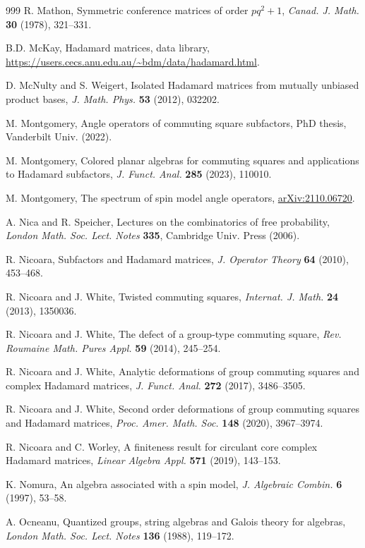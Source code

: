 \documentclass[11pt]{amsart}
\newcommand{\arx}[1]{{\hypersetup{allcolors=black}\href{https://arxiv.org/pdf/#1}{arXiv:#1}}}
\begin{document}
\begin{thebibliography}{999}
 R. Mathon, Symmetric conference matrices of order $pq^2+1$, {\em Canad. J. Math.} {\bf 30} (1978), 321--331.

 B.D. McKay, Hadamard matrices, data library, \url{https://users.cecs.anu.edu.au/~bdm/data/hadamard.html}.

 D. McNulty and S. Weigert, Isolated Hadamard matrices from mutually unbiased product bases, {\em J. Math. Phys.} {\bf 53} (2012), 032202.

 M. Montgomery, Angle operators of commuting square subfactors, PhD thesis, Vanderbilt Univ. (2022).

 M. Montgomery, Colored planar algebras for commuting squares and applications to Hadamard subfactors, {\em J. Funct. Anal.} {\bf 285} (2023), 110010.

 M. Montgomery, The spectrum of spin model angle operators, \arx{2110.06720}.

 A. Nica and R. Speicher, Lectures on the combinatorics of free probability, {\em London Math. Soc. Lect. Notes} {\bf 335}, Cambridge Univ. Press (2006).

 R. Nicoara, Subfactors and Hadamard matrices, {\em J. Operator Theory} {\bf 64} (2010), 453--468.

 R. Nicoara and J. White, Twisted commuting squares, {\em Internat. J. Math.} {\bf 24} (2013), 1350036.

 R. Nicoara and J. White, The defect of a group-type commuting square, {\em Rev. Roumaine Math. Pures Appl.} {\bf 59} (2014), 245--254.

 R. Nicoara and J. White, Analytic deformations of group commuting squares and complex Hadamard matrices, {\em J. Funct. Anal.} {\bf 272} (2017), 3486--3505.

 R. Nicoara and J. White, Second order deformations of group commuting squares and Hadamard matrices, {\em Proc. Amer. Math. Soc.} {\bf 148} (2020), 3967--3974.

 R. Nicoara and C. Worley, A finiteness result for circulant core complex Hadamard matrices, {\em Linear Algebra Appl.} {\bf 571} (2019), 143--153.

 K. Nomura, An algebra associated with a spin model, {\em J. Algebraic Combin.} {\bf 6} (1997), 53--58.

 A. Ocneanu, Quantized groups, string algebras and Galois theory for algebras, {\em London Math. Soc. Lect. Notes} {\bf 136} (1988), 119--172.


\end{thebibliography}
\end{document}
